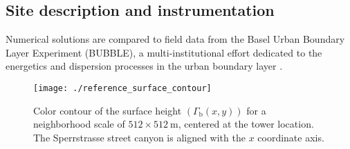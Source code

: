 \subsection{Site description and instrumentation}

Numerical solutions are compared to field data from the Basel Urban Boundary Layer Experiment (BUBBLE), a multi-institutional effort dedicated to the energetics and dispersion processes in the urban boundary layer \citep{Rotach2005}.
%
\begin{figure}[h]
	\centering
      		\texttt{[image: ./reference\_surface\_contour]} 
     	\caption{\label{basel1} Color contour of the surface height $(\Gamma_{\mathrm{b}}(x,y))$ for a neighborhood scale of $512\times512 \ \mathrm{m}$, centered at the tower location. The Sperrstrasse street canyon is aligned with the $x$ coordinate axis.}
\end{figure}



